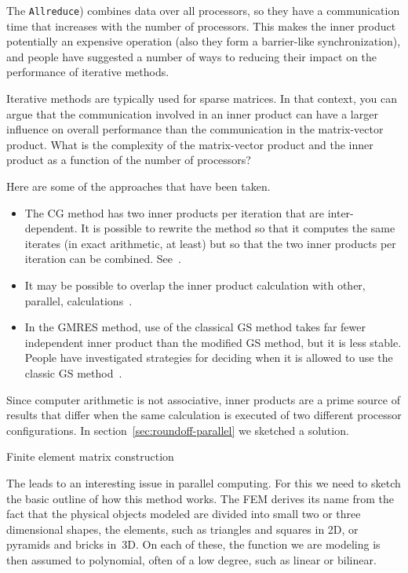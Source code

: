 The {\tt Allreduce}) combines data over all processors, so they have a
communication time that increases with the number of processors. This
makes the inner product potentially an expensive operation
(also they form a barrier-like synchronization), and people
have suggested a number of ways to reducing their impact on the
performance of iterative methods.

\begin{exercise}
  Iterative methods are typically used for sparse matrices. In that
  context, you can argue that the communication involved in an inner product
  can have a larger influence on overall performance than the
  communication in the matrix-vector product. What is the
  complexity of the matrix-vector product and the inner product as a
  function of the number of processors?
\end{exercise}

Here are some of the approaches that have been taken.
\begin{itemize}
\item The \ac{CG} method has two inner products per iteration that are
  inter-dependent. It is possible to rewrite the method so that it
  computes the same iterates (in exact arithmetic, at least) but so
  that the two inner products per iteration can be
  combined. See~\cite{ChGe:sstep,DAzEijRo:ppscicomp,Me:multicg,YandBrent:bicgstab}.
\item It may be possible to overlap the inner product calculation with
  other, parallel, calculations~\cite{dehevo92:acta}.
\item In the \ac{GMRES} method, use of the classical \acf{GS}
  method takes far fewer independent inner product than the modified
  \ac{GS} method, but it is less stable. People have investigated strategies for deciding
  when it is allowed to use the classic \ac{GS} method~\cite{Langou:thesis}.
\end{itemize}

Since computer arithmetic is not associative, inner products are a prime
source of results that differ when the same calculation is executed of
two different processor configurations. In section~\ref{sec:roundoff-parallel}
we sketched a solution.


 {Finite element matrix construction}
\label{sec:fem-assembly}

The  leads to an interesting issue in parallel
computing. For this we need to sketch the basic outline of how this
method works. The \ac{FEM} derives its name from the fact that the
physical objects modeled are divided into small two or three
dimensional shapes, the elements, such as triangles and squares in 2D,
or pyramids and bricks in~3D. On each of these, the function we are
modeling is then assumed to polynomial, often of a low degree, such as
linear or bilinear.

